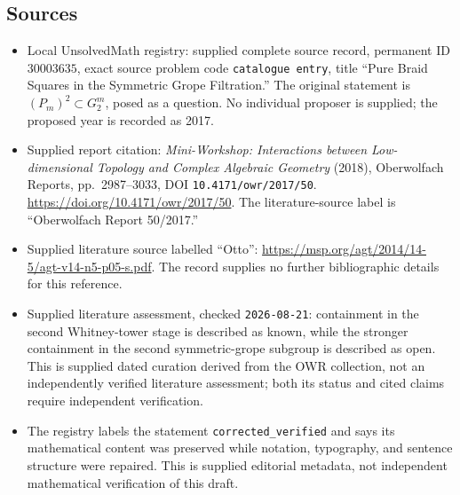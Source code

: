 \documentclass[11pt]{article}
\begin{document}
\subsection{Sources}
\begin{itemize}
\item Local UnsolvedMath registry: supplied complete source record, permanent ID \(30003635\), exact source problem code \texttt{catalogue entry}, title ``Pure Braid Squares in the Symmetric Grope Filtration.'' The original statement is \( (P_m)^2\subset G_2^m\), posed as a question. No individual proposer is supplied; the proposed year is recorded as 2017.
\item Supplied report citation: \emph{Mini-Workshop: Interactions between Low-dimensional Topology and Complex Algebraic Geometry} (2018), Oberwolfach Reports, pp.\ 2987--3033, DOI \texttt{10.4171/owr/2017/50}. \url{https://doi.org/10.4171/owr/2017/50}. The literature-source label is ``Oberwolfach Report 50/2017.''
\item Supplied literature source labelled ``Otto'': \url{https://msp.org/agt/2014/14-5/agt-v14-n5-p05-s.pdf}. The record supplies no further bibliographic details for this reference.
\item Supplied literature assessment, checked \texttt{2026-08-21}: containment in the second Whitney-tower stage is described as known, while the stronger containment in the second symmetric-grope subgroup is described as open. This is supplied dated curation derived from the OWR collection, not an independently verified literature assessment; both its status and cited claims require independent verification.
\item The registry labels the statement \texttt{corrected\_verified} and says its mathematical content was preserved while notation, typography, and sentence structure were repaired. This is supplied editorial metadata, not independent mathematical verification of this draft.
\end{itemize}
\end{document}
